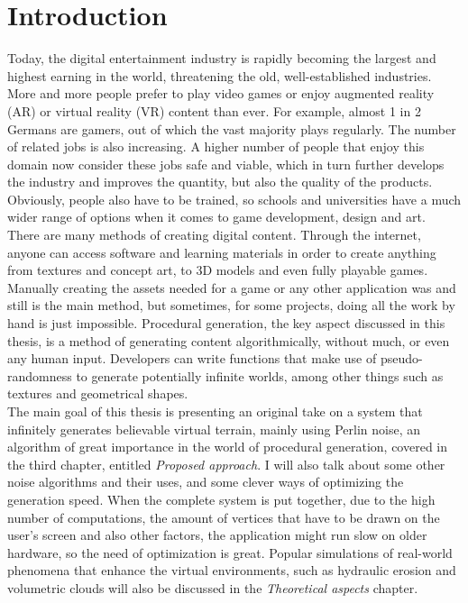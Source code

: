 \chapter*{Introduction}

\pagestyle{fancy}



\label{introduction}

Today, the digital entertainment industry is rapidly becoming the largest and highest earning in the world, threatening the old, well-established industries. More and more people prefer to play video games or enjoy augmented reality (AR) or virtual reality (VR) content than ever. For example, almost 1 in 2 Germans are gamers, out of which the vast majority plays regularly\cite{germans}. The number of related jobs is also increasing. A higher number of people that enjoy this domain now consider these jobs safe and viable, which in turn further develops the industry and improves the quantity, but also the quality of the products. Obviously, people also have to be trained, so schools and universities have a much wider range of options when it comes to game development, design and art.\\

There are many methods of creating digital content. Through the internet, anyone can access software and learning materials in order to create anything from textures and concept art, to 3D models and even fully playable games. Manually creating the assets needed for a game or any other application was and still is the main method, but sometimes, for some projects, doing all the work by hand is just impossible. Procedural generation, the key aspect discussed in this thesis, is a method of generating content algorithmically, without much, or even any human input. Developers can write functions that make use of pseudo-randomness to generate potentially infinite worlds, among other things such as textures and geometrical shapes\cite{procgenwiki}.\\

The main goal of this thesis is presenting an original take on a system that infinitely generates believable virtual terrain, mainly using Perlin noise, an algorithm of great importance in the world of procedural generation, covered in the third chapter, entitled \textit{Proposed approach}. I will also talk about some other noise algorithms and their uses, and some clever ways of optimizing the generation speed. When the complete system is put together, due to the high number of computations, the amount of vertices that have to be drawn on the user's screen and also other factors, the application might run slow on older hardware, so the need of optimization is great. Popular simulations of real-world phenomena that enhance the virtual environments, such as hydraulic erosion and volumetric clouds will also be discussed in the \textit{Theoretical aspects} chapter.